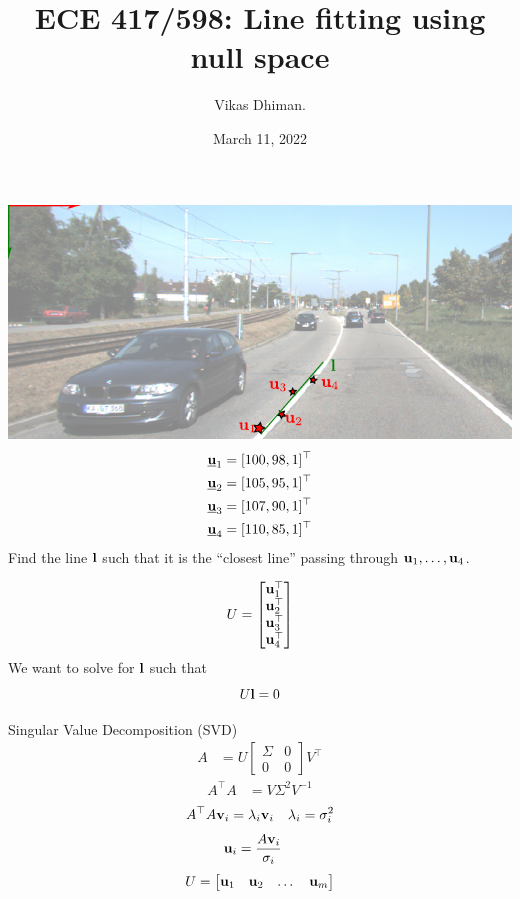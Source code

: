 \documentclass[times,t]{beamer}
\title{ECE 417/598: Line fitting using null space}
\author{Vikas Dhiman.  }
\date{March 11, 2022}
\begin{document}
\newcommand{\ubfu}{\underline{\bfu}}
\begin{frame}
  \titlepage
  \end{frame}
\begin{frame}
  \includegraphics[width=\linewidth]{media/lane-from-points.pdf}
  \begin{align*}
    \ubfu_1 &= [100, 98, 1]^\top\\
    \ubfu_2 &= [105, 95, 1]^\top\\
    \ubfu_3 &= [107, 90, 1]^\top\\
    \ubfu_4 &= [110, 85, 1]^\top
    \end{align*}
    Find  the line $\mathbf{l}$ such that it is the ``closest line'' passing through
    $\mathbf{u}_1, \dots, \mathbf{u}_4$.
\end{frame}

\begin{frame}
  \[
  U = \begin{bmatrix}\mathbf{u}_1^\top  \\
    \mathbf{u}_2^\top \\
    \mathbf{u}_3^\top \\
    \mathbf{u}_4^\top
  \end{bmatrix}
  \]
  We want to solve for $\mathbf{l}$ such that
  \[
    U \mathbf{l} = 0
  \]
\end{frame}

\begin{frame}{Singular Value  Decomposition (SVD)}
  \begin{align*}
    A  &=   U  \begin{bmatrix}\Sigma   &  0  \\   0  &  0 \end{bmatrix} V^\top
  \end{align*}
  \begin{align*}
    A^\top A &= V \Sigma^2  V^{-1}
  \end{align*}
  \begin{align*}
    A^\top A \mathbf{v}_i  &= \lambda_i \mathbf{v}_i & \lambda_i = \sigma_i^2\\
  \end{align*}
  \begin{align*}
    \mathbf{u}_i   &=  \frac{A\mathbf{v}_i}{\sigma_i}
    \end{align*}
    \begin{align*}
      U = \begin{bmatrix}
        \mathbf{u}_1 & \mathbf{u}_2 & \dots & \mathbf{u}_m
      \end{bmatrix}
    \end{align*}
\end{frame}
\end{document}
